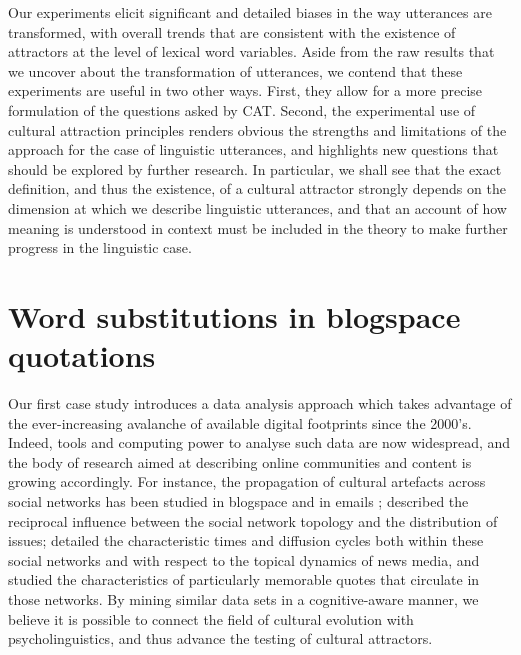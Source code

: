 \documentclass[english,]{article}
\begin{document}
Our experiments elicit significant and detailed biases in the way utterances are transformed, with overall trends that are consistent with the existence of attractors at the level of lexical word variables.
Aside from the raw results that we uncover about the transformation of utterances, we contend that these experiments are useful in two other ways.
First, they allow for a more precise formulation of the questions asked by CAT.
Second, the experimental use of cultural attraction principles renders obvious the strengths and limitations of the approach for the case of linguistic utterances, and highlights new questions that should be explored by further research.
In particular, we shall see that the exact definition, and thus the existence, of a cultural attractor strongly depends on the dimension at which we describe linguistic utterances, %
and that an account of how meaning is understood in context must be included in the theory to make further progress in the linguistic case.


\section{Word substitutions in blogspace quotations}
\label{sec:bcp}

Our first case study introduces a data analysis approach which takes advantage of the ever-increasing avalanche of available digital footprints since the 2000's.
Indeed, tools and computing power to analyse such data are now widespread, and the body of research aimed at describing online communities and content is growing accordingly.
For instance, the propagation of cultural artefacts across social networks has been studied in blogspace \autocite{gruhl_information_2004} and in emails \autocite{liben-nowell_tracing_2008};
\textcite{cointet_socio-semantic_2009} described the reciprocal influence between the social network topology and the distribution of issues;
\textcite{leskovec_meme-tracking_2009} detailed the characteristic times and diffusion cycles both within these social networks and with respect to the topical dynamics of news media, and \textcite{danescu-niculescu-mizil_you_2012} studied the characteristics of particularly memorable quotes that circulate in those networks.
By mining similar data sets in a cognitive-aware manner, we believe it is possible to connect the field of cultural evolution with psycholinguistics, and thus advance the testing of cultural attractors.
\end{document}
